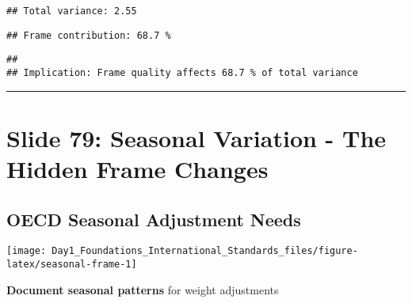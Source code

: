 \documentclass[
]{article}
\newenvironment{Shaded}{\begin{snugshade}}{\end{snugshade}}
\newcommand{\FunctionTok}[1]{\textcolor[rgb]{0.13,0.29,0.53}{\textbf{#1}}}
\newcommand{\NormalTok}[1]{#1}
\newcommand{\SpecialCharTok}[1]{\textcolor[rgb]{0.81,0.36,0.00}{\textbf{#1}}}
\newcommand{\StringTok}[1]{\textcolor[rgb]{0.31,0.60,0.02}{#1}}
\begin{document}
\begin{verbatim}
## Total variance: 2.55
\end{verbatim}

\begin{Shaded}
\end{Shaded}

\begin{verbatim}
## Frame contribution: 68.7 %
\end{verbatim}

\begin{Shaded}
\end{Shaded}

\begin{verbatim}
## 
## Implication: Frame quality affects 68.7 % of total variance
\end{verbatim}

\begin{center}\rule{0.5\linewidth}{0.5pt}\end{center}

\section{Slide 79: Seasonal Variation - The Hidden Frame
Changes}\label{slide-79-seasonal-variation---the-hidden-frame-changes}

\subsection{OECD Seasonal Adjustment
Needs}\label{oecd-seasonal-adjustment-needs}

\texttt{[image: Day1\_Foundations\_International\_Standards\_files/figure-latex/seasonal-frame-1]}

\textbf{Document seasonal patterns} for weight adjustments
\end{document}
